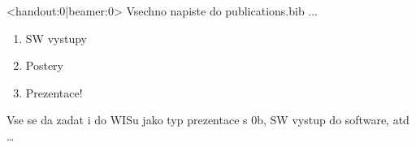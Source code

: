 \documentclass[10pt,xcolor=pdflatex]{beamer}
\begin{document}
 


\begin{frame}<handout:0|beamer:0>
  Vsechno napiste do publications.bib ...
  \begin{enumerate}
      \item SW vystupy
      \item Postery
      \item Prezentace!
  \end{enumerate}
  Vse se da zadat i do WISu jako typ prezentace s 0b, SW vystup do software, atd \dots
\end{frame}

\dolistloop{\yearlist}

\end{document}
